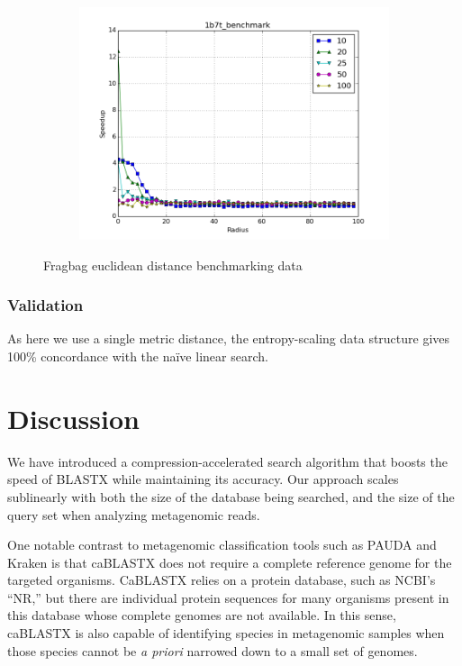\documentclass{amsbook}
\theoremstyle{definition}
\theoremstyle{remark}
\numberwithin{equation}{section}
\begin{document}
\begin{figure}[tbp]
\begin{subfigure}[b]{0.49\textwidth}
        \includegraphics[width=1\textwidth]{assets/1b7t_benchmark_euclid}
        \caption{}
    \end{subfigure}
    \caption{Fragbag euclidean distance benchmarking data}
    \label{fig:fragbag_euclid}
\end{figure}


\subsection*{Validation}
As here we use a single metric distance, the entropy-scaling data structure gives 100\% concordance with the na\"ive linear search.

\chapter*{Discussion}

We have introduced a compression-accelerated search algorithm that boosts the
speed of BLASTX while maintaining its accuracy.
Our approach scales sublinearly with both the size of the database being
searched, and the size of the query set when analyzing metagenomic reads.

One notable contrast to metagenomic classification tools such as PAUDA and
Kraken is that caBLASTX does not require a complete reference genome for the
targeted organisms.
CaBLASTX relies on a protein database, such as NCBI's ``NR,'' but there are
individual protein sequences for many organisms present in this database whose
complete genomes are not available.
In this sense, caBLASTX is also capable of identifying species in metagenomic
samples when those species cannot be \emph{a priori} narrowed down to a small
set of genomes.
\end{document}
